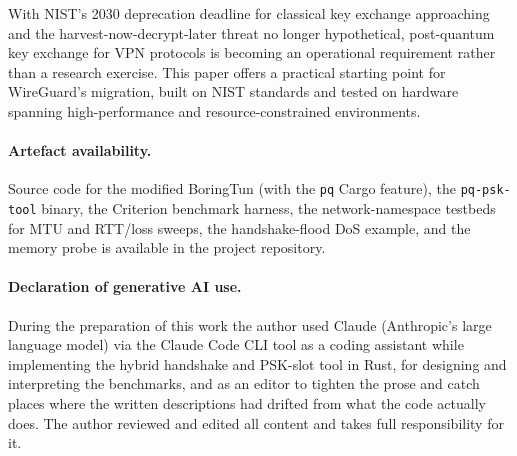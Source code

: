 \documentclass[11pt,a4paper]{article}
\begin{document}
With NIST's 2030 deprecation deadline for classical key exchange approaching~\cite{nistir8547} and the harvest-now-decrypt-later threat no longer hypothetical, post-quantum key exchange for VPN protocols is becoming an operational requirement rather than a research exercise. This paper offers a practical starting point for WireGuard's migration, built on NIST standards and tested on hardware spanning high-performance and resource-constrained environments.

\paragraph{Artefact availability.}
Source code for the modified BoringTun (with the \texttt{pq} Cargo feature), the \texttt{pq-psk-tool} binary, the Criterion benchmark harness, the network-namespace testbeds for MTU and RTT/loss sweeps, the handshake-flood DoS example, and the memory probe is available in the project repository.

\paragraph{Declaration of generative AI use.}
During the preparation of this work the author used Claude (Anthropic's large language model) via the Claude Code CLI tool as a coding assistant while implementing the hybrid handshake and PSK-slot tool in Rust, for designing and interpreting the benchmarks, and as an editor to tighten the prose and catch places where the written descriptions had drifted from what the code actually does. The author reviewed and edited all content and takes full responsibility for it.



\end{document}
